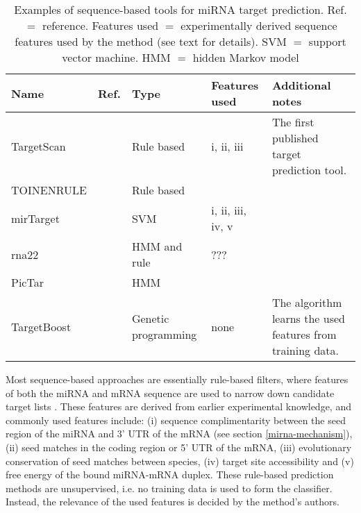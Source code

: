 \begin{table}
  \caption{Examples of sequence-based tools for miRNA target prediction.
  Ref. $=$ reference. Features used $=$ experimentally derived sequence
  features used by the method (see text for details). SVM $=$ support
  vector machine. HMM $=$ hidden Markov model}
  \label{table:sequence-methods}
  \centering
  \begingroup\small
  \begin{tabular}{ llllp{4cm} }
    \\[-1ex] \hline\hline
    \textbf{Name} & \textbf{Ref.} & \textbf{Type} & \textbf{Features used} & \textbf{Additional notes} \\
    \hline
    TargetScan  & \citep{Agarwal2015} & Rule based & i, ii, iii & The first published target prediction tool. \\
    TOINENRULE  & \citep{} & Rule based &  &  \\
    mirTarget   & \citep{} & SVM & i, ii, iii, iv, v &  \\
    rna22       & \citep{} & HMM and rule & ??? &  \\
    PicTar      & \citep{} & HMM &  &  \\
    TargetBoost & \citep{} & Genetic programming & none & The algorithm learns the used features from training data. \\
    \hline\hline
    \end{tabular}
    \endgroup
\end{table}

Most sequence-based approaches are essentially rule-based filters, where
features of both the miRNA and mRNA sequence are used to narrow down candidate
target lists \citep{Yeu2009}. These features are derived from earlier
experimental knowledge, and commonly used features include: (i) sequence
complimentarity between the seed region of the miRNA and 3' UTR of the mRNA
(see section \ref{mirna-mechanism}), (ii) seed matches in the coding region or
5' UTR of the mRNA, (iii) evolutionary conservation of seed matches between
species, (iv) target site accessibility and (v) free energy of the bound
miRNA-mRNA duplex. These rule-based prediction methods are unsupervised, i.e.
no training data is used to form the classifier. Instead, the relevance of the
used features is decided by the method's authors.


